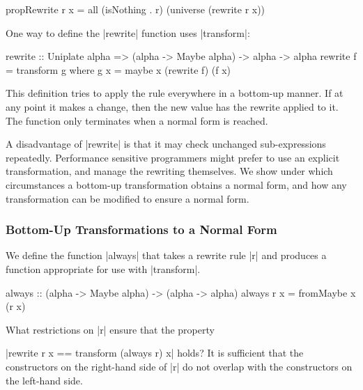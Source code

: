\begin{code}
propRewrite r x = all (isNothing . r) (universe (rewrite r x))
\end{code}

One way to define the |rewrite| function uses |transform|:

\begin{code}
rewrite :: Uniplate alpha => (alpha -> Maybe alpha) -> alpha -> alpha
rewrite f = transform g
    where g x = maybe x (rewrite f) (f x)
\end{code}

This definition tries to apply the rule everywhere in a bottom-up manner. If at any point it makes a change, then the new value has the rewrite applied to it. The function only terminates when a normal form is reached.

A disadvantage of |rewrite| is that it may check unchanged sub-expressions repeatedly. Performance sensitive programmers might prefer to use an explicit transformation, and manage the rewriting themselves. We show under which circumstances a bottom-up transformation obtains a normal form, and how any transformation can be modified to ensure a normal form.

\subsubsection{Bottom-Up Transformations to a Normal Form}
\label{secU:rewrite_bottom}

We define the function |always| that takes a rewrite rule |r| and produces a function appropriate for use with |transform|.

\begin{code}
always :: (alpha -> Maybe alpha) -> (alpha -> alpha)
always r x = fromMaybe x (r x)
\end{code}

What restrictions on |r| ensure that the property \ignore|rewrite r x == transform (always r) x| holds? It is sufficient that the constructors on the right-hand side of |r| do not overlap with the constructors on the left-hand side.


